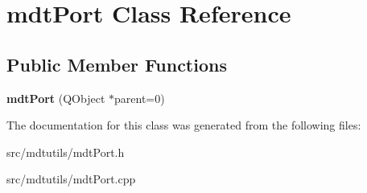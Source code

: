 \hypertarget{classmdt_port}{
\section{mdtPort Class Reference}
\label{classmdt_port}
}
\subsection*{Public Member Functions}
\begin{DoxyCompactItemize}
\item 
\hypertarget{classmdt_port_ac466eac9d1a54ea0e04c998660ad75ec}{
{\bfseries mdtPort} (QObject $\ast$parent=0)}
\label{classmdt_port_ac466eac9d1a54ea0e04c998660ad75ec}

\end{DoxyCompactItemize}


The documentation for this class was generated from the following files:\begin{DoxyCompactItemize}
\item 
src/mdtutils/mdtPort.h\item 
src/mdtutils/mdtPort.cpp\end{DoxyCompactItemize}
